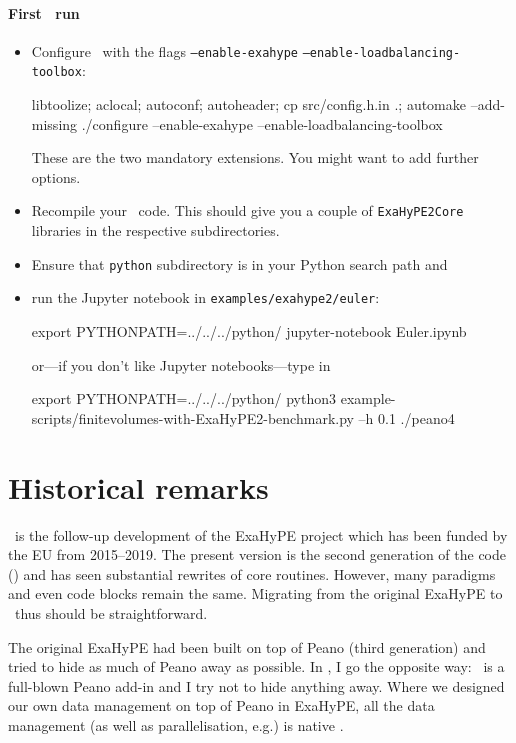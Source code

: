 \begin{framed}
\paragraph*{First \ExaHyPE\ run}
\begin{itemize}
  \item Configure \Peano\ with the flags \texttt{--enable-exahype}
  \texttt{--enable-loadbalancing-toolbox}:
  \begin{code}
libtoolize; aclocal; autoconf; autoheader; cp src/config.h.in .; automake --add-missing
./configure --enable-exahype --enable-loadbalancing-toolbox
  \end{code}
   These are the two mandatory extensions. You might want to add further options.
  \item Recompile your \Peano\ code. This should give you a couple of
  \texttt{ExaHyPE2Core} libraries in the respective subdirectories.
  \item Ensure that \texttt{python} subdirectory is in your Python search path
  and
  \item run the Jupyter notebook in \texttt{examples/exahype2/euler}: 
  \begin{code}
export PYTHONPATH=../../../python/
jupyter-notebook Euler.ipynb
  \end{code}
  \noindent
  or---if you don't like Jupyter notebooks---type in
  \begin{code}
export PYTHONPATH=../../../python/
python3 example-scripts/finitevolumes-with-ExaHyPE2-benchmark.py --h 0.1
./peano4
  \end{code}
\end{itemize}
\end{framed}



\section{Historical remarks}

\ExaHyPE\ is the follow-up development of the ExaHyPE project which has
been funded by the EU from 2015--2019.
The present version is the second generation of the code (\ExaHyPE) and has
seen substantial rewrites of core routines.
However, many paradigms and even code blocks remain the same.
Migrating from the original ExaHyPE to \ExaHyPE\ thus should be straightforward.


The original ExaHyPE had been built on top of Peano (third generation) and tried
to hide as much of Peano away as possible.
In \ExaHyPE, I go the opposite way: \ExaHyPE\ is a full-blown Peano add-in and I
try not to hide anything away.
Where we designed our own data management on top of Peano in ExaHyPE, all the
data management (as well as parallelisation, e.g.) is native \Peano.


